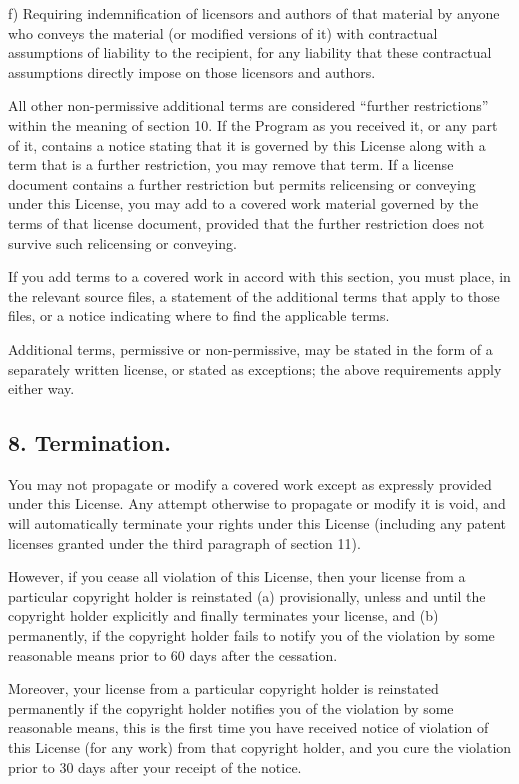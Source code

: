 \documentclass[letterpaper,10pt,english]{sphinxmanual}
\begin{document}
f) Requiring indemnification of licensors and authors of that
material by anyone who conveys the material (or modified versions of
it) with contractual assumptions of liability to the recipient, for
any liability that these contractual assumptions directly impose on
those licensors and authors.

All other non-permissive additional terms are considered ``further
restrictions'' within the meaning of section 10.  If the Program as you
received it, or any part of it, contains a notice stating that it is
governed by this License along with a term that is a further
restriction, you may remove that term.  If a license document contains
a further restriction but permits relicensing or conveying under this
License, you may add to a covered work material governed by the terms
of that license document, provided that the further restriction does
not survive such relicensing or conveying.

If you add terms to a covered work in accord with this section, you
must place, in the relevant source files, a statement of the
additional terms that apply to those files, or a notice indicating
where to find the applicable terms.

Additional terms, permissive or non-permissive, may be stated in the
form of a separately written license, or stated as exceptions;
the above requirements apply either way.


\subsection{8. Termination.}
\label{license:termination}
You may not propagate or modify a covered work except as expressly
provided under this License.  Any attempt otherwise to propagate or
modify it is void, and will automatically terminate your rights under
this License (including any patent licenses granted under the third
paragraph of section 11).

However, if you cease all violation of this License, then your
license from a particular copyright holder is reinstated (a)
provisionally, unless and until the copyright holder explicitly and
finally terminates your license, and (b) permanently, if the copyright
holder fails to notify you of the violation by some reasonable means
prior to 60 days after the cessation.

Moreover, your license from a particular copyright holder is
reinstated permanently if the copyright holder notifies you of the
violation by some reasonable means, this is the first time you have
received notice of violation of this License (for any work) from that
copyright holder, and you cure the violation prior to 30 days after
your receipt of the notice.
\end{document}
